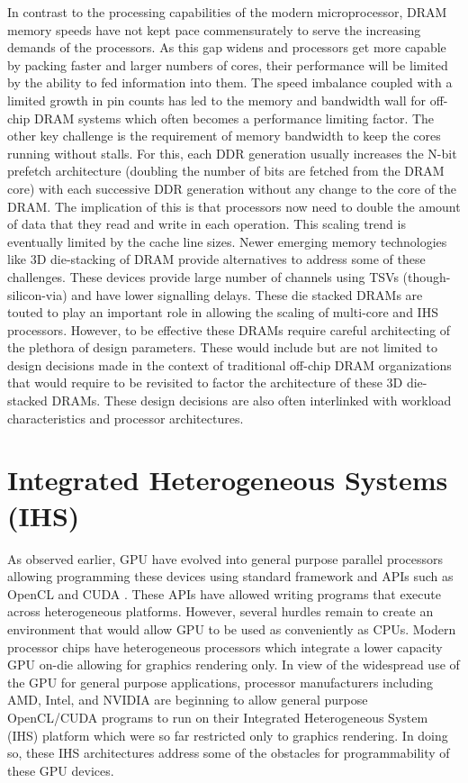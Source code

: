 \par In contrast to the processing capabilities of the modern microprocessor, DRAM memory speeds have not kept pace commensurately to serve the increasing demands of the processors. As this gap widens and processors get more capable by packing faster and larger numbers of cores, their performance will be limited by the ability to fed information into them. The speed imbalance coupled with a limited growth in pin counts has led to the memory and bandwidth wall \cite{memory-wall,bandwidth-wall} for off-chip DRAM systems which often becomes a performance limiting factor.
The other key challenge is the requirement of memory bandwidth to keep the cores running without stalls. For this, each DDR generation usually increases the N-bit prefetch architecture (doubling the number of bits are fetched from the DRAM core) with each successive DDR generation without any change to the core of the DRAM. The implication of this is that processors now need to double the amount of data that they read and write in each operation. This scaling trend is eventually limited by the cache line sizes. 
Newer emerging memory technologies like 3D die-stacking of DRAM provide alternatives to address some of these challenges. These devices provide large number of channels using TSVs (though-silicon-via) and have lower signalling delays. These die stacked DRAMs are touted to play an important role in allowing the scaling of multi-core and IHS processors.
However, to be effective these DRAMs require careful architecting of the plethora of design parameters. These would include but are not limited to design decisions made in the context of traditional off-chip DRAM organizations that would require to be revisited to factor the architecture of these 3D die-stacked DRAMs. These design decisions are also often interlinked with workload characteristics and processor architectures.



\section{Integrated Heterogeneous Systems (IHS)} \label{ihs-intro}
\par As observed earlier, GPU have evolved into general purpose parallel processors allowing programming these devices using standard framework and APIs such as OpenCL \cite{opencl}  and CUDA \cite{cuda}. These APIs have allowed writing programs that execute across heterogeneous platforms. However, several hurdles remain to create an environment that would allow GPU to be used as conveniently as CPUs. Modern processor chips have heterogeneous processors which integrate a lower capacity GPU on-die allowing for graphics rendering only. In view of the widespread use of the GPU for general purpose applications, processor manufacturers including AMD\cite{amd-apu}, Intel\cite{inteliris}, and NVIDIA\cite{denver} are beginning to allow general purpose OpenCL/CUDA programs to run on their Integrated Heterogeneous System (IHS) platform which were so far restricted only to graphics rendering. In doing so, these IHS architectures address some of the obstacles for programmability of these GPU devices.

